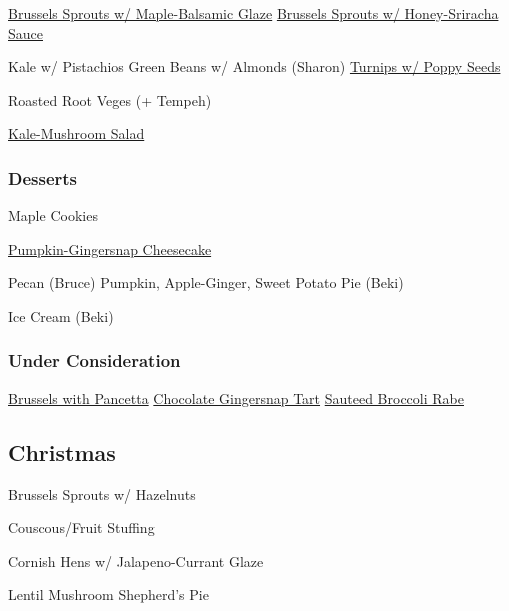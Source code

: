 \begin{centering}
 \href{http://www.seriouseats.com/recipes/2012/11/roasted-brussels-sprouts-bacon-pecans-maple-balsamic-recipe.html}{Brussels Sprouts w/ Maple-Balsamic Glaze} \blt
 \href{https://thepioneerwoman.com/food-and-friends/crispy-fried-brussels-sprouts/}{Brussels Sprouts w/ Honey-Sriracha Sauce}

 Kale w/ Pistachios \blt
 Green Beans w/ Almonds (Sharon) \blt
 \href{http://www.foodnetwork.com/recipes/mario-batali/roasted-turnips-recipe.html}{Turnips w/ Poppy Seeds}

 Roasted Root Veges (+ Tempeh)

 \href{https://www.seriouseats.com/recipes/2016/11/warm-kale-caramelized-mushroom-salad-recipe.html}{Kale-Mushroom Salad}

 \subsubsection*{Desserts}

 Maple Cookies

 \href{https://www.onceuponachef.com/recipes/pumpkin-cheesecake-with-gingersnap-crust-and-caramel-sauce.html}{Pumpkin-Gingersnap Cheesecake}

 Pecan (Bruce) \blt Pumpkin, Apple-Ginger, Sweet Potato Pie (Beki)

 Ice Cream (Beki)

 \subsubsection*{Under Consideration}

 \href{http://smittenkitchen.com/blog/2009/12/balsamic-braised-brussels-with-pancetta/}{Brussels with Pancetta} \blt
 \href{http://smittenkitchen.com/blog/2008/11/dark-chocolate-tart-with-gingersnap-crust/}{Chocolate Gingersnap Tart} \blt
 \href{http://www.foodandwine.com/recipes/broccoli-rabe-with-lemon-butter}{Sauteed Broccoli Rabe}

 \subsection*{Christmas}

 Brussels Sprouts w/ Hazelnuts

 Couscous/Fruit Stuffing

 Cornish Hens w/ Jalapeno-Currant Glaze

 Lentil \And Mushroom Shepherd's Pie


\end{centering}
